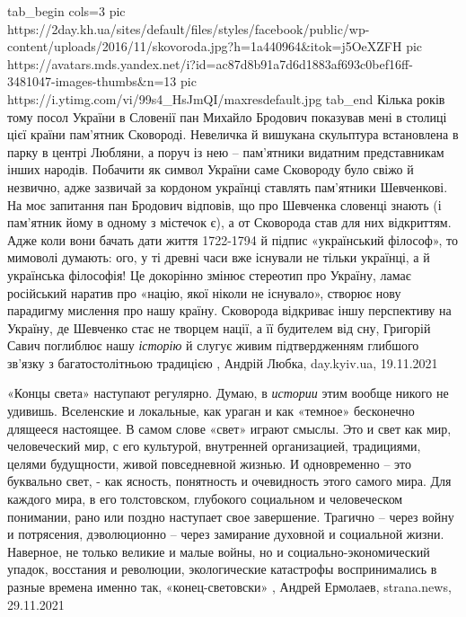 \ifcmt
  tab_begin cols=3
     pic https://2day.kh.ua/sites/default/files/styles/facebook/public/wp-content/uploads/2016/11/skovoroda.jpg?h=1a440964&itok=j5OeXZFH
		 pic https://avatars.mds.yandex.net/i?id=ac87d8b91a7d6d1883af693c0bef16ff-3481047-images-thumbs&n=13
     pic https://i.ytimg.com/vi/99s4_HsJmQI/maxresdefault.jpg
  tab_end
\fi
Кілька років тому посол України в Словенії пан Михайло Бродович показував мені
в столиці цієї країни пам’ятник Сковороді. Невеличка й вишукана скульптура
встановлена в парку в центрі Любляни, а поруч із нею – пам’ятники видатним
представникам інших народів. Побачити як символ України саме Сковороду було
свіжо й незвично, адже зазвичай за кордоном українці ставлять пам’ятники
Шевченкові.  На моє запитання пан Бродович відповів, що про Шевченка словенці
знають (і пам’ятник йому в одному з містечок є), а от Сковорода став для них
відкриттям.  Адже коли вони бачать дати життя 1722-1794 й підпис «український
філософ», то мимоволі думають: ого, у ті древні часи вже існували не тільки
українці, а й українська філософія! Це докорінно змінює стереотип про Україну,
ламає російський наратив про «націю, якої ніколи не існувало», створює нову
парадигму мислення про нашу країну. Сковорода відкриває іншу перспективу на
Україну, де Шевченко стає не творцем нації, а її будителем від сну, Григорій
Савич поглиблює нашу \emph{історію} й слугує живим підтвердженням глибшого
зв’язку з багатостолітньою традицією
, 
Андрій Любка, day.kyiv.ua, 19.11.2021

«Концы света» наступают регулярно. Думаю, в \emph{истории} этим вообще никого
не удивишь. Вселенские и локальные, как ураган и как «темное» бесконечно
длящееся настоящее. В самом слове «свет» играют смыслы. Это и свет как мир,
человеческий мир, с его культурой, внутренней организацией, традициями, целями
будущности, живой повседневной жизнью. И одновременно – это буквально свет, -
как ясность, понятность и очевидность этого самого мира. Для каждого мира, в
его толстовском, глубокого социальном и человеческом понимании, рано или поздно
наступает свое завершение. Трагично – через войну и потрясения, дэволюционно –
через замирание духовной и социальной жизни.  Наверное, не только великие и
малые войны, но и социально-экономический упадок, восстания и революции,
экологические катастрофы воспринимались в разные времена именно так,
«конец-световски»
, Андрей Ермолаев, strana.news, 29.11.2021

